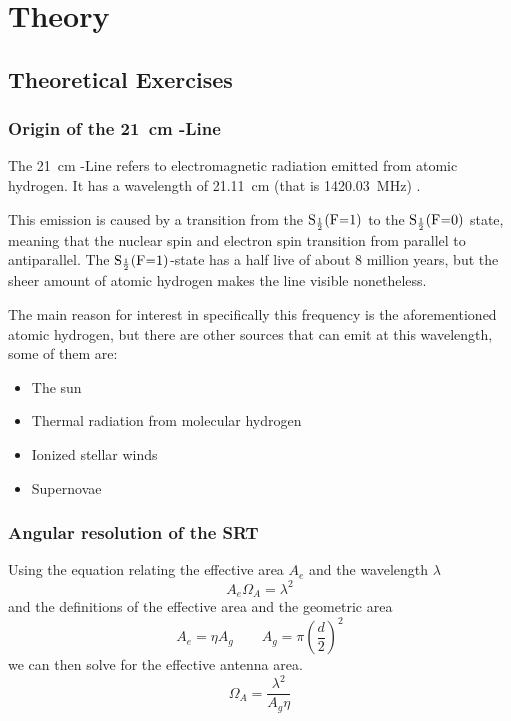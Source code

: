 \section{Theory}
\subsection{Theoretical Exercises}
\subsubsection[Origin of the 21 cm HI-Line]{Origin of the \SI{21}{cm} -Line}
The \SI{21}{cm} -Line refers to electromagnetic radiation emitted from atomic hydrogen. It has a wavelength of \SI{21.11}{cm} (that is \SI{1420.03}{\mega\hertz}) \cite[Ch 3.1]{srt}.

This emission is caused by a transition from the $\ce{S_{\frac{1}{2}}(F=1)}$ to the $\ce{S_{\frac{1}{2}}(F=0)}$ state, meaning that the nuclear spin and electron spin transition from parallel to antiparallel.
The $\ce{S_{\frac{1}{2}}(F=1)}$-state has a half live of about 8 million years, but the sheer amount of atomic hydrogen makes the line visible nonetheless. \cite[Ch. 13.1]{wilson_tools_2009}

The main reason for interest in specifically this frequency is the aforementioned atomic hydrogen, but there are other sources that can emit at this wavelength, some of them are: \cite[11.1-11.4]{wilson_tools_2009}
\begin{itemize}
    \item The sun
    \item Thermal radiation from molecular hydrogen
    \item Ionized stellar winds
    \item Supernovae
\end{itemize}
\subsubsection{Angular resolution of the SRT}\label{sec:ang_res}
Using the equation relating the effective area $A_e$ and the wavelength $\lambda$ \cite[p. 149]{wilson_tools_2009}
\begin{equation}
    A_e \Omega_A = \lambda^2
\end{equation}
and the definitions of the effective area and the geometric area \cite[p. 148]{wilson_tools_2009}
\begin{equation}
    A_e = \eta A_g \qquad A_g = \pi \left( \frac{d}{2} \right)^2 \label{eq:A_e}
\end{equation}
we can then solve for the effective antenna area.
\begin{equation}
    \Omega_A = \frac{\lambda^2}{A_g \eta} \label{eq:Omega_A}
\end{equation}


